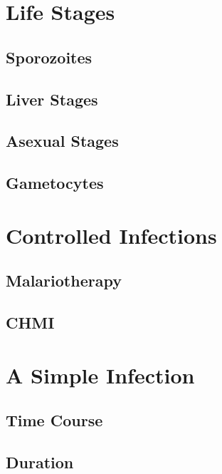 \documentclass[
]{book}
\begin{document}
\section{Life Stages}\label{life-stages}

\subsection{Sporozoites}\label{sporozoites}

\subsection{Liver Stages}\label{liver-stages}

\subsection{Asexual Stages}\label{asexual-stages}

\subsection{Gametocytes}\label{gametocytes}

\section{Controlled Infections}\label{controlled-infections}

\subsection{Malariotherapy}\label{malariotherapy}

\subsection{CHMI}\label{chmi}

\section{A Simple Infection}\label{a-simple-infection}

\subsection{Time Course}\label{time-course}

\subsection{Duration}\label{duration}
\end{document}
